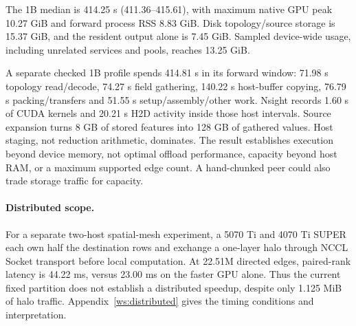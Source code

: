 The 1B median is 414.25 s (411.36--415.61), with maximum native GPU peak
10.27 GiB and forward process RSS 8.83 GiB. Disk topology/source storage is
15.37 GiB, and the resident output alone is 7.45 GiB. Sampled device-wide
usage, including unrelated services and pools, reaches 13.25 GiB.

A separate checked 1B profile spends 414.81 s in its forward window:
71.98 s topology read/decode, 74.27 s field gathering, 140.22 s host-buffer
copying, 76.79 s packing/transfers and 51.55 s setup/assembly/other work.
Nsight records 1.60 s of CUDA kernels and 20.21 s H2D activity inside those
host intervals. Source expansion turns 8 GB of stored features into 128 GB
of gathered values. Host staging, not reduction arithmetic, dominates.
The result establishes execution beyond device memory, not optimal offload
performance, capacity beyond host RAM, or a maximum supported edge count.
A hand-chunked peer could also trade storage traffic for capacity.

\paragraph{Distributed scope.}
For a separate two-host spatial-mesh experiment, a 5070 Ti and 4070 Ti SUPER
each own half the destination rows and exchange a one-layer halo through
NCCL Socket transport before local computation. At 22.51M directed edges,
paired-rank latency is 44.22 ms, versus 23.00 ms on the faster GPU alone.
Thus the current fixed partition does not establish a distributed speedup,
despite only 1.125 MiB of halo traffic. Appendix~\ref{ws:distributed} gives
the timing conditions and interpretation.
\FloatBarrier
